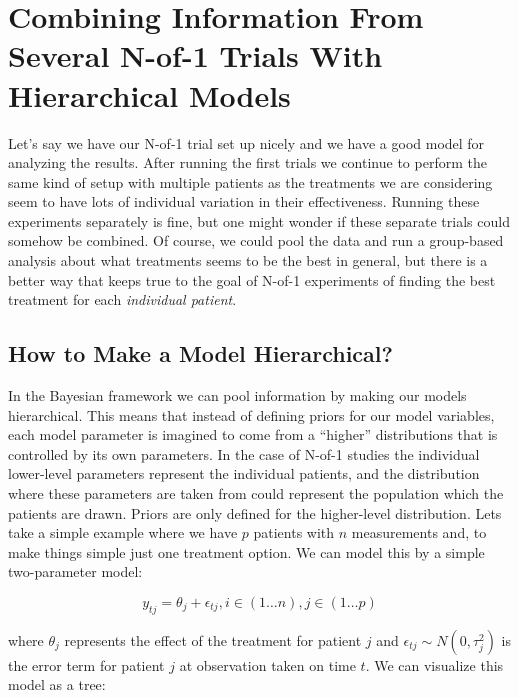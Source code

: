 \documentclass[12pt,a4paper,leqno]{report}
\theoremstyle{plain}
\theoremstyle{definition}
\theoremstyle{remark}
\begin{document}
\chapter{Combining Information From Several N-of-1 Trials With Hierarchical
  Models}\label{hierarchicalbayes}

Let's say we have our N-of-1 trial set up nicely and we have a good model for analyzing the
results. After running the first trials we continue to perform the same kind of setup
with multiple patients as the treatments we are considering seem to have lots of
individual variation in their effectiveness. Running these experiments separately is
fine, but one might wonder if these separate trials could somehow be combined. Of course, we could pool the data and run a group-based
analysis about what treatments seems to be the best in general, but there is a better
way that keeps true to the goal of N-of-1 experiments of finding the best treatment for
each \emph{individual patient}.

\section{How to Make a Model Hierarchical?}

In the Bayesian framework we can pool information by making our models hierarchical.
This means that instead of defining priors for our model variables, each model parameter is imagined to come from a ``higher'' distributions
that is controlled by its own parameters. In the case of N-of-1 studies the individual lower-level parameters represent the
individual patients, and the distribution where these parameters are taken from could represent
the population which the patients are drawn. Priors are only defined for the higher-level distribution. Lets take a simple example where we have $p$ patients with $n$
measurements and, to make things simple just one treatment option. We can model this by
a simple two-parameter model:

\begin{def}\label{}
    \begin{equation}\label{simplehierachical}
        y_{tj} = \theta_j + \epsilon_{tj}, i\in(1 \dots n), j\in(1 \dots p)
    \end{equation}
\end{def}where $\theta_j$ represents the effect of the treatment for patient $j$ and
\(\epsilon_{tj} \sim N(0,\tau_j^2)\) is the error term for patient $j$ at observation
taken on time $t$. We can visualize this model as a tree:
\end{document}
